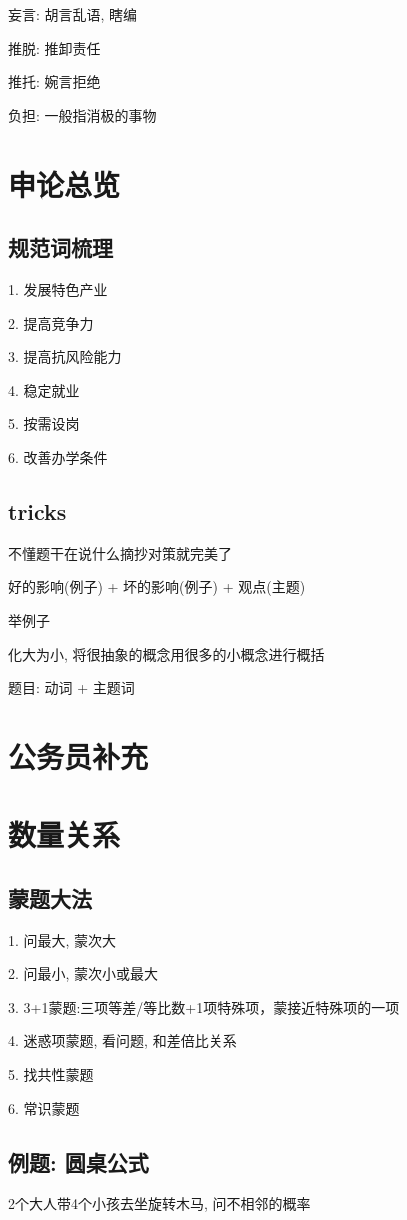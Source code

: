 \documentclass[UTF8]{ctexart}
\begin{document}
妄言: 胡言乱语, 瞎编

推脱: 推卸责任

推托: 婉言拒绝

负担: 一般指消极的事物

\section{申论总览}

\subsection{规范词梳理}

1. 发展特色产业

2. 提高竞争力

3. 提高抗风险能力

4. 稳定就业

5. 按需设岗

6. 改善办学条件

\subsection{tricks}

不懂题干在说什么摘抄对策就完美了

好的影响(例子) + 坏的影响(例子) + 观点(主题)

举例子

化大为小, 将很抽象的概念用很多的小概念进行概括

题目: 动词 + 主题词

\section{公务员补充}

\section{数量关系}
\subsection{蒙题大法}
1. 问最大, 蒙次大

2. 问最小, 蒙次小或最大

3. 3+1蒙题:三项等差/等比数+1项特殊项，蒙接近特殊项的一项

4. 迷惑项蒙题, 看问题, 和差倍比关系

5. 找共性蒙题

6. 常识蒙题

\subsection{例题: 圆桌公式}
2个大人带4个小孩去坐旋转木马, 问不相邻的概率
\end{document}
